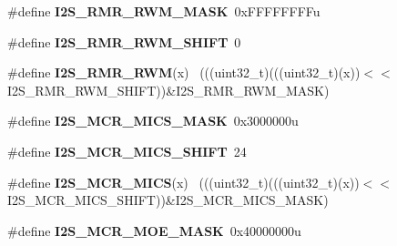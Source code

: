 \begin{DoxyCompactItemize}
\item 
\hypertarget{group___i2_s___register___masks_ga72f2c1e6c8be00aa0227c8d924c3506a}{}\#define {\bfseries I2\+S\+\_\+\+R\+M\+R\+\_\+\+R\+W\+M\+\_\+\+M\+A\+S\+K}~0x\+F\+F\+F\+F\+F\+F\+F\+Fu\label{group___i2_s___register___masks_ga72f2c1e6c8be00aa0227c8d924c3506a}

\item 
\hypertarget{group___i2_s___register___masks_gaf69010ae59c583206d59a8cc0c681c04}{}\#define {\bfseries I2\+S\+\_\+\+R\+M\+R\+\_\+\+R\+W\+M\+\_\+\+S\+H\+I\+F\+T}~0\label{group___i2_s___register___masks_gaf69010ae59c583206d59a8cc0c681c04}

\item 
\hypertarget{group___i2_s___register___masks_ga7ba1c2c5eed2f45b4ffd6dc887628801}{}\#define {\bfseries I2\+S\+\_\+\+R\+M\+R\+\_\+\+R\+W\+M}(x)                                                  ~(((uint32\+\_\+t)(((uint32\+\_\+t)(x))$<$$<$I2\+S\+\_\+\+R\+M\+R\+\_\+\+R\+W\+M\+\_\+\+S\+H\+I\+F\+T))\&I2\+S\+\_\+\+R\+M\+R\+\_\+\+R\+W\+M\+\_\+\+M\+A\+S\+K)\label{group___i2_s___register___masks_ga7ba1c2c5eed2f45b4ffd6dc887628801}

\item 
\hypertarget{group___i2_s___register___masks_ga4c26e3cecbf702523474909a853e29b8}{}\#define {\bfseries I2\+S\+\_\+\+M\+C\+R\+\_\+\+M\+I\+C\+S\+\_\+\+M\+A\+S\+K}~0x3000000u\label{group___i2_s___register___masks_ga4c26e3cecbf702523474909a853e29b8}

\item 
\hypertarget{group___i2_s___register___masks_gabf7e721def09b1b0b95908cfafe51512}{}\#define {\bfseries I2\+S\+\_\+\+M\+C\+R\+\_\+\+M\+I\+C\+S\+\_\+\+S\+H\+I\+F\+T}~24\label{group___i2_s___register___masks_gabf7e721def09b1b0b95908cfafe51512}

\item 
\hypertarget{group___i2_s___register___masks_ga2504ccb253f4d41c8a32c3cdeb372ff3}{}\#define {\bfseries I2\+S\+\_\+\+M\+C\+R\+\_\+\+M\+I\+C\+S}(x)                                                ~(((uint32\+\_\+t)(((uint32\+\_\+t)(x))$<$$<$I2\+S\+\_\+\+M\+C\+R\+\_\+\+M\+I\+C\+S\+\_\+\+S\+H\+I\+F\+T))\&I2\+S\+\_\+\+M\+C\+R\+\_\+\+M\+I\+C\+S\+\_\+\+M\+A\+S\+K)\label{group___i2_s___register___masks_ga2504ccb253f4d41c8a32c3cdeb372ff3}

\item 
\hypertarget{group___i2_s___register___masks_ga03150d6df8ff9955e1f8175ef1ebd1ab}{}\#define {\bfseries I2\+S\+\_\+\+M\+C\+R\+\_\+\+M\+O\+E\+\_\+\+M\+A\+S\+K}~0x40000000u\label{group___i2_s___register___masks_ga03150d6df8ff9955e1f8175ef1ebd1ab}


\end{DoxyCompactItemize}
